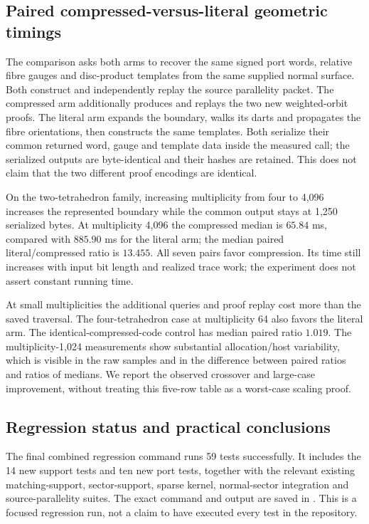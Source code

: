 \subsection{Paired compressed-versus-literal geometric timings}

The comparison asks both arms to recover the same signed port words,
relative fibre gauges and disc-product templates from the same supplied
normal surface. Both construct and independently replay the source
parallelity packet. The compressed arm additionally produces and
replays the two new weighted-orbit proofs. The literal arm expands the
boundary, walks its darts and propagates the fibre orientations, then
constructs the same templates. Both serialize their common returned
word, gauge and template data inside the measured call; the serialized
outputs are byte-identical and their hashes are retained. This does
not claim that the two different proof encodings are identical.



On the two-tetrahedron family, increasing multiplicity from four to
4,096 increases the represented boundary while the common output stays
at 1,250 serialized bytes. At multiplicity 4,096 the compressed median
is \(65.84\) ms, compared with \(885.90\) ms for the literal arm;
the median paired literal/compressed ratio is \(13.455\).
All seven pairs favor compression. Its time still increases with input
bit length and realized trace work; the experiment does not assert
constant running time.

At small multiplicities the additional queries and proof replay cost
more than the saved traversal. The four-tetrahedron case at multiplicity
64 also favors the literal arm. The identical-compressed-code control
has median paired ratio \(1.019\). The multiplicity-1,024 measurements
show substantial allocation/host variability, which is visible in
the raw samples and in the difference between paired ratios and ratios
of medians. We report the observed crossover and large-case improvement,
without treating this five-row table as a worst-case scaling proof.

\subsection{Regression status and practical conclusions}

The final combined regression command runs 59 tests successfully.
It includes the 14 new support tests and ten new port tests, together
with the relevant existing matching-support, sector-support, sparse
kernel, normal-sector integration and source-parallelity suites. The
exact command and output are saved in
. This is a focused regression
run, not a claim to have executed every test in the repository.

